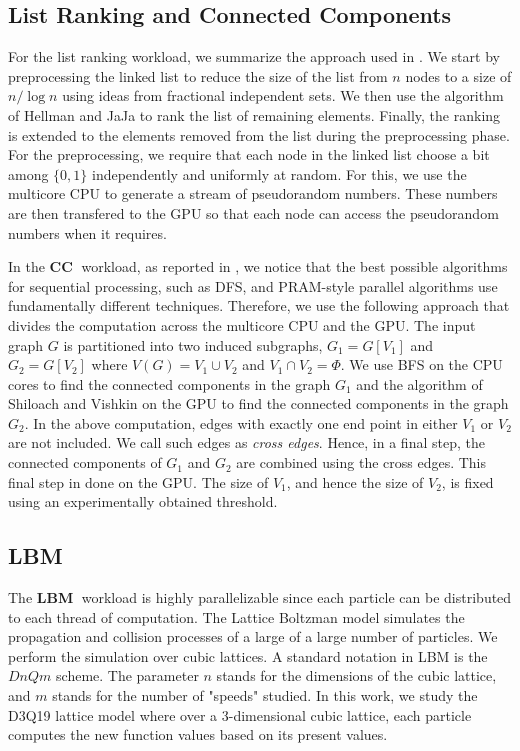\documentclass[11pt]{article}
\newcommand{\CC} {{\bf CC}}
\newcommand{\LBM} {{\bf LBM}}
\begin{document}
\subsection{List Ranking and Connected Components}
For the list ranking workload, we summarize the approach used in
\cite{hipc11,lspp12}. We start by preprocessing the linked list to reduce 
the size of the list from $n$ nodes to a size of $n/\log n$ using ideas from
fractional independent sets. We then use the algorithm of Hellman and JaJa
\cite{HJ99} to rank the list of remaining elements. Finally, the ranking is
extended to the elements removed from the list during the preprocessing
phase. For the preprocessing, we require that each node in the linked list
choose a bit among $\{0, 1\}$ independently and uniformly at random. For
this, we use the multicore CPU to generate a stream of pseudorandom
numbers. These numbers are then transfered to the GPU so that each node can
access the pseudorandom numbers when it requires. 

In the \CC$\;$ workload, as reported in \cite{hipc11},
we notice that the best possible algorithms for
sequential processing, such as DFS, and PRAM-style parallel algorithms use
fundamentally different techniques. Therefore, we use the following
approach that divides the computation across the multicore CPU and the
GPU. The input  graph $G$ is partitioned into two induced subgraphs,
$G_1 = G[V_1]$ and $G_2 = G[V_2]$ where $V(G) = V_1 \cup V_2$ and $V_1 \cap V_2 =
\Phi$. We use BFS on the CPU cores to find the connected components in the 
graph $G_1$ and the algorithm of Shiloach and Vishkin \cite{sv} on the
GPU to find the connected components in the graph $G_2$.
In the above computation, edges with exactly one end point in either $V_1$
or $V_2$ are not included. We call such edges as {\em cross edges}. 
Hence, in a final step, the connected components of $G_1$ and $G_2$ are
combined using the cross edges. This final step in done on the GPU. The
size of $V_1$, and hence the size of $V_2$, is fixed using an
experimentally obtained threshold. 


\subsection{LBM}
The \LBM$\;$ workload is highly parallelizable since each particle can be distributed to
each thread of computation. The Lattice Boltzman model simulates the
propagation and collision processes of a large of a large number of
particles. We perform the simulation over cubic lattices. 
A standard notation in LBM is the $DnQm$ scheme. The parameter $n$ stands
for the dimensions of the cubic lattice, and $m$ stands for the number of
"speeds" studied. In this work, we study the D3Q19 lattice
model where over a 3-dimensional cubic lattice, each particle computes the new
function values based on its present values. 
\end{document}
